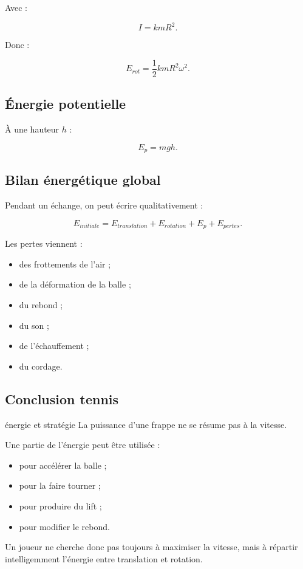\documentclass[11pt,a4paper]{article}
\begin{document}
Avec :

\[
I=kmR^2.
\]

Donc :

\[
E_{rot}=\frac12kmR^2\omega^2.
\]

\subsection{Énergie potentielle}

À une hauteur $h$ :

\[
E_p=mgh.
\]

\subsection{Bilan énergétique global}

Pendant un échange, on peut écrire qualitativement :

\[
E_{initiale}=E_{translation}+E_{rotation}+E_p+E_{pertes}.
\]

Les pertes viennent :
\begin{itemize}
    \item des frottements de l'air ;
    \item de la déformation de la balle ;
    \item du rebond ;
    \item du son ;
    \item de l'échauffement ;
    \item du cordage.
\end{itemize}

\subsection{Conclusion tennis}

\begin{tennis}{énergie et stratégie}
La puissance d'une frappe ne se résume pas à la vitesse.

Une partie de l'énergie peut être utilisée :
\begin{itemize}
    \item pour accélérer la balle ;
    \item pour la faire tourner ;
    \item pour produire du lift ;
    \item pour modifier le rebond.
\end{itemize}

Un joueur ne cherche donc pas toujours à maximiser la vitesse, mais à répartir intelligemment l'énergie entre translation et rotation.
\end{tennis}
\end{document}
